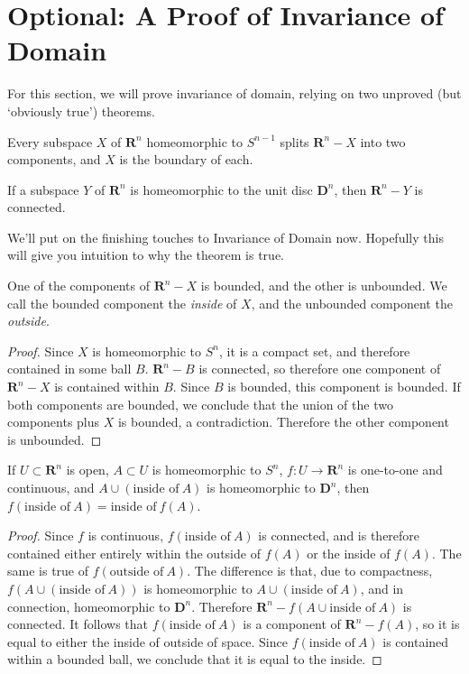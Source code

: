 \section{Optional: A Proof of Invariance of Domain}

For this section, we will prove invariance of domain, relying on two unproved (but `obviously true') theorems.

\begin{theorem}
    Every subspace $X$ of $\mathbf{R}^n$ homeomorphic to $S^{n-1}$ splits $\mathbf{R}^n - X$ into two components, and $X$ is the boundary of each.
\end{theorem}

\begin{theorem}
    If a subspace $Y$ of $\mathbf{R}^n$ is homeomorphic to the unit disc $\mathbf{D}^n$, then $\mathbf{R}^n - Y$ is connected.
\end{theorem}

We'll put on the finishing touches to Invariance of Domain now. Hopefully this will give you intuition to why the theorem is true.

\begin{lemma}
    One of the components of $\mathbf{R}^n - X$ is bounded, and the other is unbounded. We call the bounded component the \emph{inside} of $X$, and the unbounded component the \emph{outside}.
\end{lemma}
\begin{proof}
    Since $X$ is homeomorphic to $S^n$, it is a compact set, and therefore contained in some ball $B$. $\mathbf{R}^n - B$ is connected, so therefore one component of $\mathbf{R}^n - X$ is contained within $B$. Since $B$ is bounded, this component is bounded. If both components are bounded, we conclude that the union of the two components plus $X$ is bounded, a contradiction. Therefore the other component is unbounded.
\end{proof}

\begin{lemma}
    If $U \subset \mathbf{R}^n$ is open, $A \subset U$ is homeomorphic to $S^n$, $f:U \to \mathbf{R}^n$ is one-to-one and continuous, and $A \cup (\text{inside of}\ A)$ is homeomorphic to $\mathbf{D}^n$, then $f(\text{inside of}\ A) = \text{inside of}\ f(A)$.
\end{lemma}
\begin{proof}
    Since $f$ is continuous, $f(\text{inside of}\ A)$ is connected, and is therefore contained either entirely within the outside of $f(A)$ or the inside of $f(A)$. The same is true of $f(\text{outside of}\ A)$. The difference is that, due to compactness, $f(A \cup (\text{inside of}\ A))$ is homeomorphic to $A \cup (\text{inside of}\ A)$, and in connection, homeomorphic to $\mathbf{D}^n$. Therefore $\mathbf{R}^n - f(A \cup \text{inside of}\ A)$ is connected. It follows that $f(\text{inside of}\ A)$ is a component of $\mathbf{R}^n - f(A)$, so it is equal to either the inside of outside of space. Since $f(\text{inside of}\ A)$ is contained within a bounded ball, we conclude that it is equal to the inside.
\end{proof}


